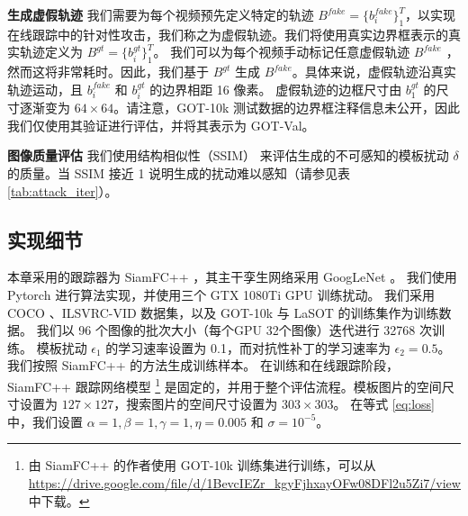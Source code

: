 \textbf{生成虚假轨迹} 我们需要为每个视频预先定义特定的轨迹 $B^{fake}=\{b^{fake}_i\}_1^{T}$，以实现在线跟踪中的针对性攻击，我们称之为虚假轨迹。我们将使用真实边界框表示的真实轨迹定义为 $B^{gt}=\{b^{gt}_i\}_1^T$。
我们可以为每个视频手动标记任意虚假轨迹 $B^{fake}$ ，然而这将非常耗时。因此，我们基于 $B^{gt}$ 生成 $B^{fake}$。具体来说，虚假轨迹沿真实轨迹运动，且 $b^{fake}_i$ 和 $b^{gt}_i$ 的边界相距 16 像素。
虚假轨迹的边框尺寸由 $b^{gt}_1$ 的尺寸逐渐变为 $64\times 64$。请注意，GOT-10k 测试数据的边界框注释信息未公开，因此我们仅使用其验证进行评估，并将其表示为 GOT-Val。

\textbf{图像质量评估} 我们使用结构相似性（SSIM）\cite{SSIM} 来评估生成的不可感知的模板扰动 $\delta$ 的质量。当 SSIM 接近 1 说明生成的扰动难以感知（请参见表 \ref{tab:attack_iter}）。

\subsection{实现细节}

本章采用的跟踪器为 SiamFC++ \cite{SiamFC++}，其主干孪生网络采用 GoogLeNet \cite{GoogLeNet}。
我们使用 Pytorch 进行算法实现，并使用三个 GTX 1080Ti GPU 训练扰动。
我们采用 COCO \cite{COCO}、ILSVRC-VID \cite{VID} 数据集，以及 GOT-10k \cite{GOT-10k} 与 LaSOT \cite{LaSOT} 的训练集作为训练数据。
我们以 96 个图像的批次大小（每个GPU 32个图像）迭代进行 32768 次训练。
模板扰动 $\epsilon_1$ 的学习速率设置为 0.1，而对抗性补丁的学习速率为 $\epsilon_2 = 0.5$。
我们按照 SiamFC++ 的方法生成训练样本。
在训练和在线跟踪阶段，SiamFC++ 跟踪网络模型 \footnote{由 SiamFC++ 的作者使用 GOT-10k 训练集进行训练，可以从 \url{https://drive.google.com/file/d/1BevcIEZr_kgyFjhxayOFw08DFl2u5Zi7/view} 中下载。} 是固定的，并用于整个评估流程。模板图片的空间尺寸设置为 $127\times 127$，搜索图片的空间尺寸设置为 $303\times 303$。
在等式 \ref{eq:loss} 中，我们设置 $\alpha=1, \beta=1, \gamma=1, \eta=0.005$ 和 $\sigma=10^{-5}$。

